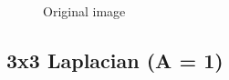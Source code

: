 \begin{figure}[!htb]
\begin{minipage}{0.40\textwidth}
        \caption{Original image}
        \end{minipage}
    \end{figure}


    \pagebreak
    \subsection{3x3 Laplacian (A = 1)}

